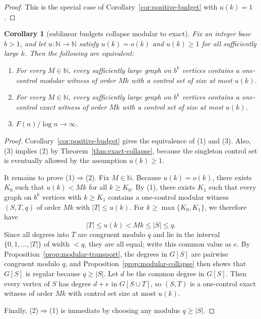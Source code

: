 \documentclass[11pt]{amsart}
\newtheorem{corollary}[theorem]{Corollary}
\theoremstyle{definition}
\newcommand{\N}{\mathbb{N}}
\begin{document}
\begin{proof}
This is the special case of Corollary~\ref{cor:positive-budget} with $u(k)=1$.
\end{proof}

\begin{corollary}[sublinear budgets collapse modular to exact]\label{cor:sublinear-budget}
Fix an integer base $b>1$, and let $u \colon \N \to \N$ satisfy $u(k)=o(k)$ and $u(k) \ge 1$ for all
sufficiently large $k$. Then the following are equivalent:
\begin{enumerate}
  \item For every $M \in \N$, every sufficiently large graph on $b^k$ vertices contains a
    one-control modular witness of order $Mk$ with a control set of size at most $u(k)$.
  \item For every $M \in \N$, every sufficiently large graph on $b^k$ vertices contains a
    one-control exact witness of order $Mk$ with a control set of size at most $u(k)$.
  \item $F(n)/\log n \to \infty$.
\end{enumerate}
\end{corollary}

\begin{proof}
Corollary~\ref{cor:positive-budget} gives the equivalence of (1) and (3). Also, (3) implies (2) by
Theorem~\ref{thm:exact-collapse}, because the singleton control set is eventually allowed by the
assumption $u(k) \ge 1$.

It remains to prove (1)$\Rightarrow$(2). Fix $M \in \N$. Because $u(k)=o(k)$, there exists $K_0$
such that $u(k) < Mk$ for all $k \ge K_0$. By (1), there exists $K_1$ such that every graph on
$b^k$ vertices with $k \ge K_1$ contains a one-control modular witness $(S,T,q)$ of order $Mk$
with $|T| \le u(k)$. For $k \ge \max\{K_0,K_1\}$, we therefore have
\[
  |T| \le u(k) < Mk \le |S| \le q.
\]
Since all degrees into $T$ are congruent modulo $q$ and lie in the interval $\{0,1,\dots,|T|\}$ of
width $<q$, they are all equal; write this common value as $e$. By
Proposition~\ref{prop:modular-transport}, the degrees in $G[S]$ are pairwise congruent modulo $q$,
and Proposition~\ref{prop:modular-collapse} then shows that $G[S]$ is regular because $q \ge |S|$.
Let $d$ be the common degree in $G[S]$. Then every vertex of $S$ has degree $d+e$ in $G[S \cup T]$,
so $(S,T)$ is a one-control exact witness of order $Mk$ with control set size at most $u(k)$.

Finally, (2)$\Rightarrow$(1) is immediate by choosing any modulus $q \ge |S|$.
\end{proof}
\end{document}
